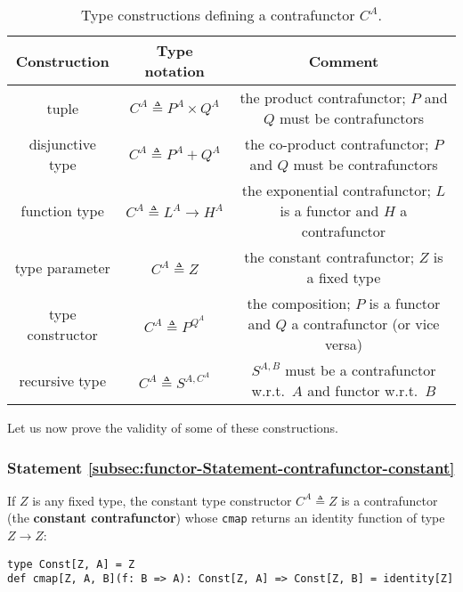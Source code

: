 \begin{table}
\begin{centering}
\begin{tabular}{|c|c|c|}
\hline 
\textbf{\small{}Construction} & \textbf{\small{}Type notation} & \textbf{\small{}Comment}\tabularnewline
\hline 
\hline 
{\footnotesize{}tuple} & {\footnotesize{}$C^{A}\triangleq P^{A}\times Q^{A}$} & {\footnotesize{}the product contrafunctor; $P$ and $Q$ must be contrafunctors}\tabularnewline
\hline 
{\footnotesize{}disjunctive type} & {\footnotesize{}$C^{A}\triangleq P^{A}+Q^{A}$} & {\footnotesize{}the co-product contrafunctor; $P$ and $Q$ must be
contrafunctors}\tabularnewline
\hline 
{\footnotesize{}function type} & {\footnotesize{}$C^{A}\triangleq L^{A}\rightarrow H^{A}$} & {\footnotesize{}the exponential contrafunctor; $L$ is a functor and
$H$ a contrafunctor}\tabularnewline
\hline 
{\footnotesize{}type parameter} & {\footnotesize{}$C^{A}\triangleq Z$} & {\footnotesize{}the constant contrafunctor; $Z$ is a fixed type}\tabularnewline
\hline 
{\footnotesize{}type constructor} & {\footnotesize{}$C^{A}\triangleq P^{Q^{A}}$} & {\footnotesize{}the composition; $P$ is a functor and $Q$ a contrafunctor
(or vice versa)}\tabularnewline
\hline 
{\footnotesize{}recursive type} & {\footnotesize{}$C^{A}\triangleq S^{A,C^{A}}$} & {\footnotesize{}$S^{A,B}$ must be a contrafunctor w.r.t.~$A$ and
functor w.r.t.~$B$}\tabularnewline
\hline 
\end{tabular}
\par\end{centering}
\caption{Type constructions defining a contrafunctor $C^{A}$.\label{tab:f-Contrafunctor-constructions}}
\end{table}

Let us now prove the validity of some of these constructions.

\subsubsection{Statement \label{subsec:functor-Statement-contrafunctor-constant}\ref{subsec:functor-Statement-contrafunctor-constant}}

If $Z$ is any fixed type, the constant type constructor $C^{A}\triangleq Z$
is a contrafunctor (the \textbf{constant contrafunctor})
whose \lstinline!cmap! returns an identity function of type $Z\rightarrow Z$:
\begin{lstlisting}
type Const[Z, A] = Z
def cmap[Z, A, B](f: B => A): Const[Z, A] => Const[Z, B] = identity[Z] 
\end{lstlisting}


